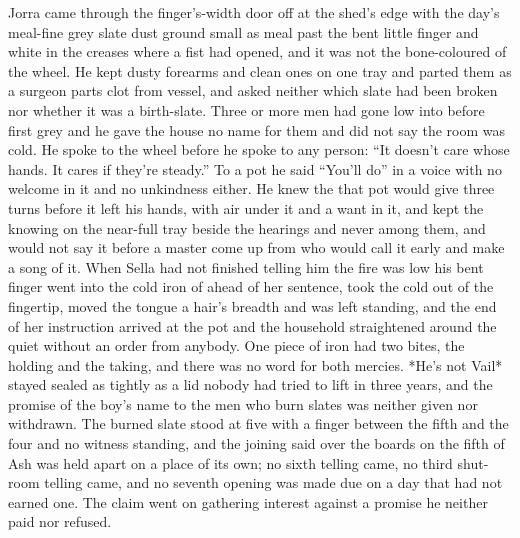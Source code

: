 Jorra came through the finger's-width door off  at the shed's edge with the day's meal-fine grey slate dust ground small as meal past the bent little finger and white in the creases where a fist had opened, and it was not the bone-coloured  of the wheel. He kept dusty forearms and clean ones on one tray and parted them as a surgeon parts clot from vessel, and asked neither which slate had been broken nor whether it was a birth-slate. Three or more men had gone low into  before first grey and he gave the house no name for them and did not say the room was cold. He spoke to the wheel before he spoke to any person: “It doesn't care whose hands. It cares if they're steady.” To a pot he said “You'll do” in a voice with no welcome in it and no unkindness either. He knew the  that pot would give three turns before it left his hands, with air under it and a want in it, and kept the knowing on the near-full tray beside the hearings and never among them, and would not say it before a master come up from  who would call it early and make a song of it. When Sella had not finished telling him the fire was low his bent finger went into the cold iron of  ahead of her sentence, took the cold out of the fingertip, moved the tongue a hair's breadth and was left standing, and the end of her instruction arrived at the pot and the household straightened around the quiet without an order from anybody. One piece of iron had two bites, the holding and the taking, and there was no  word for both mercies. *He's not Vail* stayed sealed as tightly as a lid nobody had tried to lift in three years, and the promise of the boy's name to the men who burn slates was neither given nor withdrawn. The burned slate stood at five with a finger between the fifth and the four and no witness standing, and the joining said over the boards on the fifth of Ash was held apart on a place of its own; no sixth telling came, no third shut-room telling came, and no seventh opening was made due on a day that had not earned one. The claim went on gathering interest against a promise he neither paid nor refused.

